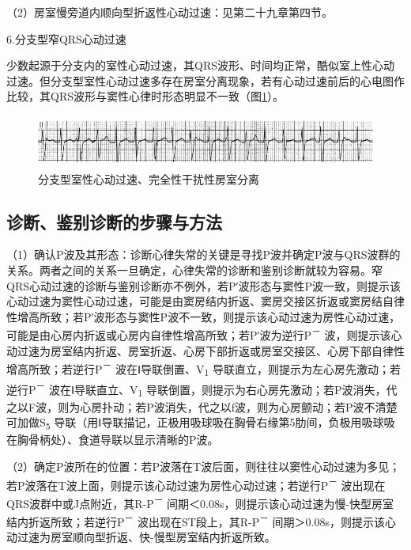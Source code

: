 （2）房室慢旁道内顺向型折返性心动过速：见第二十九章第四节。

6.分支型窄QRS心动过速

少数起源于分支内的室性心动过速，其QRS波形、时间均正常，酷似室上性心动过速。但分支型室性心动过速多存在房室分离现象，若有心动过速前后的心电图作比较，其QRS波形与窦性心律时形态明显不一致（图\ref{fig32-12}）。

\begin{figure}[!htbp]
 \centering
 \includegraphics[width=5.58333in,height=0.6875in]{./images/Image00528.jpg}
 \captionsetup{justification=centering}
 \caption{分支型室性心动过速、完全性干扰性房室分离}
 \label{fig32-12}
  \end{figure} 

\protect\hypertarget{text00039.htmlux5cux23subid441}{}{}

\subsection{诊断、鉴别诊断的步骤与方法}

（1）确认P波及其形态：诊断心律失常的关键是寻找P波并确定P波与QRS波群的关系。两者之间的关系一旦确定，心律失常的诊断和鉴别诊断就较为容易。窄QRS心动过速的诊断与鉴别诊断亦不例外，若P′波形态与窦性P波一致，则提示该心动过速为窦性心动过速，可能是由窦房结内折返、窦房交接区折返或窦房结自律性增高所致；若P′波形态与窦性P波不一致，则提示该心动过速为房性心动过速，可能是由心房内折返或心房内自律性增高所致；若P′波为逆行P\textsuperscript{－}
波，则提示该心动过速为房室结内折返、房室折返、心房下部折返或房室交接区、心房下部自律性增高所致；若逆行P\textsuperscript{－}
波在Ⅰ导联倒置、V\textsubscript{1}
导联直立，则提示为左心房先激动；若逆行P\textsuperscript{－}
波在Ⅰ导联直立、V\textsubscript{1}
导联倒置，则提示为右心房先激动；若P波消失，代之以F波，则为心房扑动；若P波消失，代之以f波，则为心房颤动；若P波不清楚可加做S\textsubscript{5}
导联（用Ⅰ导联描记，正极用吸球吸在胸骨右缘第5肋间，负极用吸球吸在胸骨柄处）、食道导联以显示清晰的P波。

（2）确定P波所在的位置：若P波落在T波后面，则往往以窦性心动过速为多见；若P波落在T波上面，则提示该心动过速为房性心动过速；若逆行P\textsuperscript{－}
波出现在QRS波群中或J点附近，其R-P\textsuperscript{－}
间期＜0.08s，则提示该心动过速为慢-快型房室结内折返所致；若逆行P\textsuperscript{－}
波出现在ST段上，其R-P\textsuperscript{－}
间期＞0.08s，则提示该心动过速为房室顺向型折返、快-慢型房室结内折返所致。

